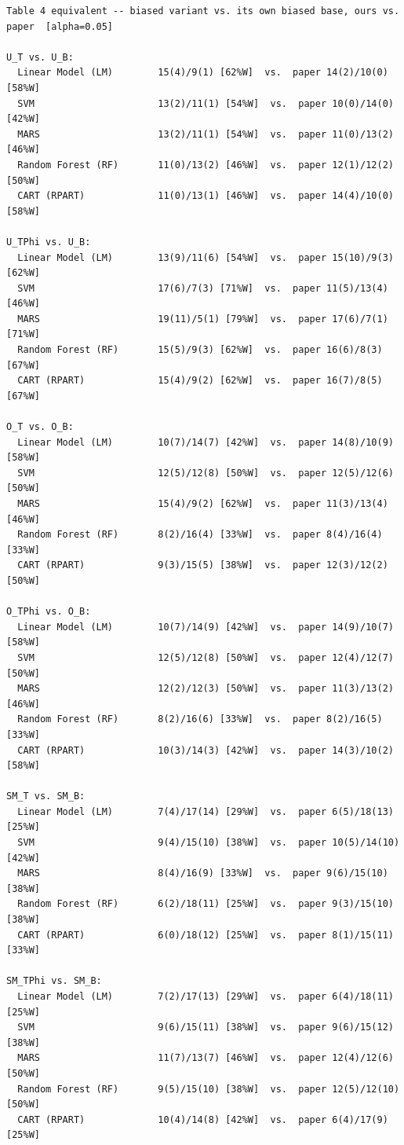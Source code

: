 \begingroup
{}
\label{tab:exp002_cmp_cmp_table4}
\scriptsize
\begin{verbatim}
Table 4 equivalent -- biased variant vs. its own biased base, ours vs. paper  [alpha=0.05]

U_T vs. U_B:
  Linear Model (LM)        15(4)/9(1) [62%W]  vs.  paper 14(2)/10(0) [58%W]
  SVM                      13(2)/11(1) [54%W]  vs.  paper 10(0)/14(0) [42%W]
  MARS                     13(2)/11(1) [54%W]  vs.  paper 11(0)/13(2) [46%W]
  Random Forest (RF)       11(0)/13(2) [46%W]  vs.  paper 12(1)/12(2) [50%W]
  CART (RPART)             11(0)/13(1) [46%W]  vs.  paper 14(4)/10(0) [58%W]

U_TPhi vs. U_B:
  Linear Model (LM)        13(9)/11(6) [54%W]  vs.  paper 15(10)/9(3) [62%W]
  SVM                      17(6)/7(3) [71%W]  vs.  paper 11(5)/13(4) [46%W]
  MARS                     19(11)/5(1) [79%W]  vs.  paper 17(6)/7(1) [71%W]
  Random Forest (RF)       15(5)/9(3) [62%W]  vs.  paper 16(6)/8(3) [67%W]
  CART (RPART)             15(4)/9(2) [62%W]  vs.  paper 16(7)/8(5) [67%W]

O_T vs. O_B:
  Linear Model (LM)        10(7)/14(7) [42%W]  vs.  paper 14(8)/10(9) [58%W]
  SVM                      12(5)/12(8) [50%W]  vs.  paper 12(5)/12(6) [50%W]
  MARS                     15(4)/9(2) [62%W]  vs.  paper 11(3)/13(4) [46%W]
  Random Forest (RF)       8(2)/16(4) [33%W]  vs.  paper 8(4)/16(4) [33%W]
  CART (RPART)             9(3)/15(5) [38%W]  vs.  paper 12(3)/12(2) [50%W]

O_TPhi vs. O_B:
  Linear Model (LM)        10(7)/14(9) [42%W]  vs.  paper 14(9)/10(7) [58%W]
  SVM                      12(5)/12(8) [50%W]  vs.  paper 12(4)/12(7) [50%W]
  MARS                     12(2)/12(3) [50%W]  vs.  paper 11(3)/13(2) [46%W]
  Random Forest (RF)       8(2)/16(6) [33%W]  vs.  paper 8(2)/16(5) [33%W]
  CART (RPART)             10(3)/14(3) [42%W]  vs.  paper 14(3)/10(2) [58%W]

SM_T vs. SM_B:
  Linear Model (LM)        7(4)/17(14) [29%W]  vs.  paper 6(5)/18(13) [25%W]
  SVM                      9(4)/15(10) [38%W]  vs.  paper 10(5)/14(10) [42%W]
  MARS                     8(4)/16(9) [33%W]  vs.  paper 9(6)/15(10) [38%W]
  Random Forest (RF)       6(2)/18(11) [25%W]  vs.  paper 9(3)/15(10) [38%W]
  CART (RPART)             6(0)/18(12) [25%W]  vs.  paper 8(1)/15(11) [33%W]

SM_TPhi vs. SM_B:
  Linear Model (LM)        7(2)/17(13) [29%W]  vs.  paper 6(4)/18(11) [25%W]
  SVM                      9(6)/15(11) [38%W]  vs.  paper 9(6)/15(12) [38%W]
  MARS                     11(7)/13(7) [46%W]  vs.  paper 12(4)/12(6) [50%W]
  Random Forest (RF)       9(5)/15(10) [38%W]  vs.  paper 12(5)/12(10) [50%W]
  CART (RPART)             10(4)/14(8) [42%W]  vs.  paper 6(4)/17(9) [25%W]

\end{verbatim}
\endgroup
